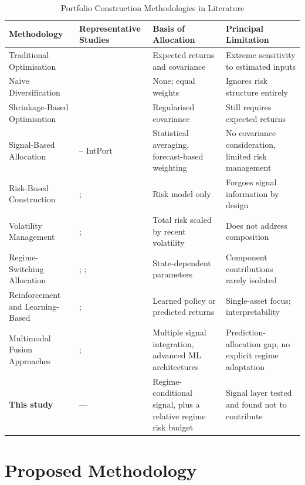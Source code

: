 \documentclass{singlecol-new}
\theoremstyle{TH}{
\newtheorem{lemma}{Lemma}
\newtheorem{theorem}[lemma]{Theorem}
\newtheorem{corrolary}[lemma]{Corrolary}
\newtheorem{conjecture}[lemma]{Conjecture}
\newtheorem{proposition}[lemma]{Proposition}
\newtheorem{claim}[lemma]{Claim}
\newtheorem{stheorem}[lemma]{Wrong Theorem}
\newtheorem{algorithm}{Algorithm}
}
\theoremstyle{THrm}{
\newtheorem{definition}{Definition}[section]
\newtheorem{question}{Question}[section]
\newtheorem{remark}{Remark}
\newtheorem{scheme}{Scheme}
}
\theoremstyle{THhit}{
\newtheorem{case}{Case}[section]
}
\begin{document}
\begin{table}[!ht]
\centering
\caption{Portfolio Construction Methodologies in Literature}
\label{tab:paradigms}
\footnotesize
\begin{tabular}{p{2.3cm}p{2.5cm}p{2.6cm}p{2.6cm}}
\hline
\textbf{Methodology} & \textbf{Representative Studies} & \textbf{Basis of Allocation} & \textbf{Principal Limitation} \\
\hline
Traditional Optimisation & \citet{markowitz52} & Expected returns and covariance & Extreme sensitivity to estimated inputs \\
\hline
Naive Diversification & \citet{demiguel09} & None; equal weights & Ignores risk structure entirely \\
\hline
Shrinkage-Based Optimisation & \citet{ledoit04} & Regularised covariance & Still requires expected returns \\
\hline
Signal-Based Allocation & \citet{sami25} -- IntPort & Statistical averaging, forecast-based weighting & No covariance consideration, limited risk management \\
\hline
Risk-Based Construction & \citet{prado16}; \citet{asimit25} & Risk model only & Forgoes signal information by design \\
\hline
Volatility Management & \citet{moreira17}; \citet{hood25} & Total risk scaled by recent volatility & Does not address composition \\
\hline
Regime-Switching Allocation & \citet{kritzman12}; \citet{li25}; \citet{luo26} & State-dependent parameters & Component contributions rarely isolated \\
\hline
Reinforcement and Learning-Based & \citet{kabbani22}; \citet{ha26} & Learned policy or predicted returns & Single-asset focus; interpretability \\
\hline
Multimodal Fusion Approaches & \citet{moodi24}; \citet{farimani24} & Multiple signal integration, advanced ML architectures & Prediction-allocation gap, no explicit regime adaptation \\
\hline
\textbf{This study} & --- & Regime-conditional signal, plus a relative regime risk budget & Signal layer tested and found not to contribute \\
\hline
\end{tabular}
\end{table}

\section{Proposed Methodology}
\label{sec:method}
\end{document}

